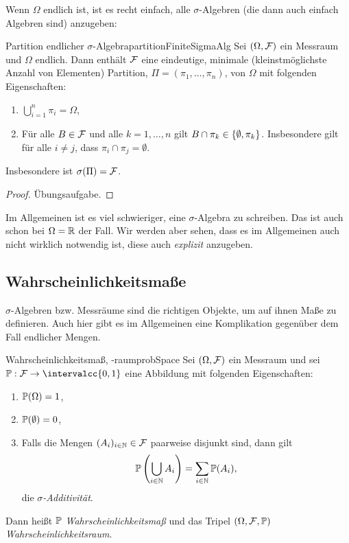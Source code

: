 \documentclass[language=ngerman]{../../Template/TemplateLecture}
\begin{document}
Wenn $\Omega$ endlich ist, ist es recht einfach, alle $\sigma$-Algebren (die dann auch einfach Algebren sind) anzugeben:

\begin{lem}{Partition endlicher $\sigma$-Algebra}{partitionFiniteSigmaAlg}
    Sei $(\Omega, \mathcal{F})$ ein Messraum und $\Omega$ endlich. Dann enthält $\mathcal{F}$ eine eindeutige, minimale (kleinstmöglichste Anzahl von Elementen) Partition, $\Pi = (\pi_1, \ldots, \pi_n)$, von $\Omega$ mit folgenden Eigenschaften:
    \begin{enumerate}[$(i)$]
        \item $\bigcup_{i = 1}^n \pi_i = \Omega$,
        \item Für alle $B \in \mathcal{F}$ und alle $k = 1, \ldots, n$ gilt $B \cap \pi_k \in \{\emptyset, \pi_k\}$. Insbesondere gilt für alle $i \neq j$, dass $\pi_i \cap \pi_j = \emptyset$.
    \end{enumerate}
    Insbesondere ist $\sigma(\Pi) = \mathcal{F}$.
\end{lem}

\begin{proof}
    Übungsaufgabe.
\end{proof}

Im Allgemeinen ist es viel schwieriger, eine $\sigma$-Algebra zu schreiben. Das ist auch schon bei $\Omega = \mathbb{R}$ der Fall. Wir werden aber sehen, dass es im Allgemeinen auch nicht wirklich notwendig ist, diese auch \emph{explizit} anzugeben.


\subsection{Wahrscheinlichkeitsmaße}
$\sigma$-Algebren bzw. Messräume sind die richtigen Objekte, um auf ihnen Maße zu definieren. Auch hier gibt es im Allgemeinen eine Komplikation gegenüber dem Fall endlicher Mengen.

\begin{defi}{Wahrscheinlichkeitsmaß, -raum}{probSpace}
    Sei $(\Omega, \mathcal{F})$ ein Messraum und sei $\IP: \cF \to \intervalcc{0,1}$ eine Abbildung mit folgenden Eigenschaften:
    \begin{enumerate}[$(i)$]
        \item $\mathbb{P}(\Omega) = 1$,
        \item $\mathbb{P}(\emptyset) = 0$,
        \item Falls die Mengen $(A_i)_{i \in \mathbb{N}} \in \mathcal{F}$ paarweise disjunkt sind, dann gilt 
        \begin{equation}
            \mathbb{P}\left(\bigcup_{i \in \mathbb{N}} A_i\right) = \sum_{i \in \mathbb{N}} \mathbb{P}(A_i),
        \end{equation}
        die \emph{$\sigma$-Additivität}.
    \end{enumerate}
    Dann heißt $\mathbb{P}$ \emph{Wahrscheinlichkeitsmaß} und das Tripel $(\Omega, \mathcal{F}, \mathbb{P})$ \emph{Wahrscheinlichkeitsraum}.
\end{defi}
\end{document}
